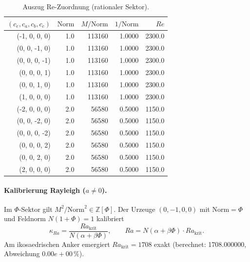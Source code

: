 \begin{table}[ht]
  \centering
  \caption{Auszug Re-Zuordnung (rationaler Sektor).}
  \label{tab:eabc-re-zuordnung}
  \begin{tabular}{rrrrr}
    \toprule
    $(c_e,c_a,c_b,c_c)$ & $\mathrm{Norm}$ & $M/\mathrm{Norm}$ & $1/\mathrm{Norm}$ & $Re$ \\
    \midrule
    (-1, 0, 0, 0) & 1.0 & 113160 & 1.0000 & 2300.0 \\
    (0, 0, -1, 0) & 1.0 & 113160 & 1.0000 & 2300.0 \\
    (0, 0, 0, -1) & 1.0 & 113160 & 1.0000 & 2300.0 \\
    (0, 0, 0, 1) & 1.0 & 113160 & 1.0000 & 2300.0 \\
    (0, 0, 1, 0) & 1.0 & 113160 & 1.0000 & 2300.0 \\
    (1, 0, 0, 0) & 1.0 & 113160 & 1.0000 & 2300.0 \\
    (-2, 0, 0, 0) & 2.0 & 56580 & 0.5000 & 1150.0 \\
    (0, 0, -2, 0) & 2.0 & 56580 & 0.5000 & 1150.0 \\
    (0, 0, 0, -2) & 2.0 & 56580 & 0.5000 & 1150.0 \\
    (0, 0, 0, 2) & 2.0 & 56580 & 0.5000 & 1150.0 \\
    (0, 0, 2, 0) & 2.0 & 56580 & 0.5000 & 1150.0 \\
    (2, 0, 0, 0) & 2.0 & 56580 & 0.5000 & 1150.0 \\
    \bottomrule
  \end{tabular}
\end{table}

\paragraph{Kalibrierung Rayleigh ($a\neq 0$).}
Im $\Phi$-Sektor gilt $M^2/\mathrm{Norm}^2\in\mathbb{Z}[\Phi]$.
Der Urzeuge $(0,-1,0,0)$ mit $\mathrm{Norm}=\Phi$ und Feldnorm
$N(1+\Phi)=1$ kalibriert
\[
  \kappa_{Ra} = \frac{Ra_{\mathrm{krit}}}{N(\alpha+\beta\Phi)},
  \qquad Ra = N(\alpha+\beta\Phi)\cdot Ra_{\mathrm{krit}}.
\]
Am ikosaedrischen Anker emergiert $Ra_{\mathrm{krit}} = 1708$ exakt
(berechnet: 1708.000000, Abweichung $0.00e+00\,\%$).


